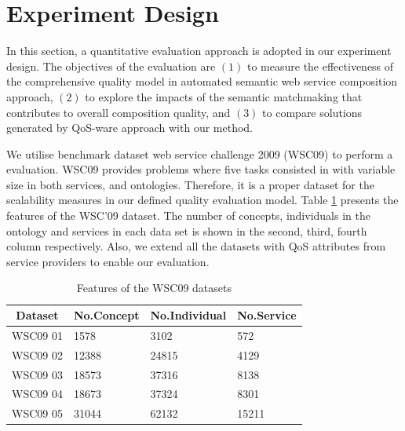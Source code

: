 \documentclass{llncs}
\begin{document}
\section{Experiment Design}\label{experiment_design}
In this section, a quantitative evaluation approach is adopted in our experiment design. The objectives of the evaluation are $(1)$ to measure the effectiveness of the comprehensive quality model in automated semantic web service composition approach, $(2)$ to explore the impacts of the semantic matchmaking that contributes to overall composition quality, and $(3)$ to compare solutions generated by QoS-ware approach with our method.

We utilise benchmark dataset web service challenge 2009 (WSC09) \cite{kona2009wsc} to perform a evaluation. WSC09 provides problems where five tasks consisted in with variable size in both services, and ontologies. Therefore, it is a proper dataset for the scalability measures in our defined quality evaluation model. Table \ref{wsc09datasetTable} presents the features of the WSC’09 dataset. The number of concepts, individuals in the ontology and services in each data set is shown in the second, third, fourth column respectively. Also, we extend all the datasets with QoS attributes from service providers to enable our evaluation. 
\begin{table}[]
\centering
\caption{Features of the WSC09 datasets}
\label{wsc09datasetTable}
\begin{tabular}{|l|l|l|l|}
\hline
\multicolumn{1}{|c|}{Dataset} & No.Concept & No.Individual & No.Service \\ \hline
WSC09 01                     & 1578       &3102           &572      \\ \hline
WSC09 02                     & 12388      &24815          &4129      \\ \hline
WSC09 03                     & 18573      &37316          &8138      \\ \hline
WSC09 04                     & 18673      &37324          &8301      \\ \hline
WSC09 05                     & 31044      &62132          &15211    \\ \hline
\end{tabular}
\end{table}
\end{document}
